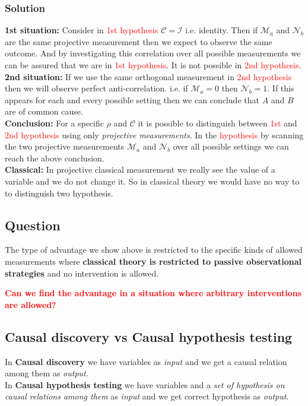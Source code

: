\documentclass[a4paper,11pt]{article}
\begin{document}
	\subsubsection{Solution}
	\textbf{1st situation:} Consider in \textcolor{red}{1st hypothesis} $\mathcal{C}=\mathcal{I}$ i.e. identity. Then if $\mathcal{M}_a$ and $\mathcal{N}_b$ are the same projective measurement then we expect to observe the same outcome. And by investigating this correlation over all possible measurements we can be assured that we are in \textcolor{red}{1st hypothesis}. It is not possible in \textcolor{red}{2nd hypothesis}.
	\\
	
	\noindent\textbf{2nd situation:} If we use the same orthogonal measurement in \textcolor{red}{2nd hypothesis} then we will observe perfect anti-correlation. i.e. if $\mathcal{M}_a=0$ then $\mathcal{N}_b=1$. If this appears for each and every possible setting then we can conclude that $A$ and $B$ are of common cause.
	\\
	
	\noindent \textbf{Conclusion:} For a specific $\rho$ and $\mathcal{C}$ it is possible to distinguish between \textcolor{red}{1st} and \textcolor{red}{2nd hypothesis} using only \textit{projective measurements}.
	In the \textcolor{red}{hypothesis} by scanning the two projective measurements $\mathcal{M}_a$ and $\mathcal{N}_b$ over all possible settings we can reach the above conclusion.
	\\
	
	\noindent\textbf{Classical:} In projective classical measurement we really see the value of a variable and we do not change it. So in classical theory we would have no way to to distinguish two hypothesis.
	
	\subsection{Question}
	The type of advantage we show above is restricted to the specific kinds of allowed measurements where \textbf{classical theory is restricted to passive observational strategies} and no intervention is allowed.
	
	\noindent\textbf{\textcolor{red}{Can we find the advantage in a situation where arbitrary interventions are allowed?}}
	
	\subsection{Causal discovery vs Causal hypothesis testing}
	In \textbf{Causal discovery} we have variables as \textit{input} and we get a causal relation among them as \textit{output}.
	\\
	\noindent In \textbf{Causal hypothesis testing} we have variables and a \textit{set of hypothesis on causal relations among them} as \textit{input} and we get correct hypothesis as \textit{output}.
	
\end{document}

